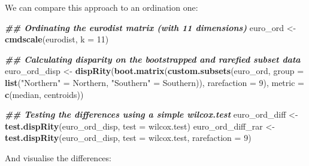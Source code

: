 \documentclass[
]{book}
\newenvironment{Shaded}{\begin{snugshade}}{\end{snugshade}}
\newcommand{\AttributeTok}[1]{\textcolor[rgb]{0.13,0.29,0.53}{#1}}
\newcommand{\DecValTok}[1]{\textcolor[rgb]{0.00,0.00,0.81}{#1}}
\newcommand{\DocumentationTok}[1]{\textcolor[rgb]{0.56,0.35,0.01}{\textbf{\textit{#1}}}}
\newcommand{\FunctionTok}[1]{\textcolor[rgb]{0.13,0.29,0.53}{\textbf{#1}}}
\newcommand{\NormalTok}[1]{#1}
\newcommand{\OtherTok}[1]{\textcolor[rgb]{0.56,0.35,0.01}{#1}}
\newcommand{\StringTok}[1]{\textcolor[rgb]{0.31,0.60,0.02}{#1}}
\begin{document}
We can compare this approach to an ordination one:

\begin{Shaded}
\begin{Highlighting}[]
\DocumentationTok{\#\# Ordinating the eurodist matrix (with 11 dimensions)}
\NormalTok{euro\_ord }\OtherTok{\textless{}{-}} \FunctionTok{cmdscale}\NormalTok{(eurodist, }\AttributeTok{k =} \DecValTok{11}\NormalTok{)}

\DocumentationTok{\#\# Calculating disparity on the bootstrapped and rarefied subset data}
\NormalTok{euro\_ord\_disp }\OtherTok{\textless{}{-}} \FunctionTok{dispRity}\NormalTok{(}\FunctionTok{boot.matrix}\NormalTok{(}\FunctionTok{custom.subsets}\NormalTok{(euro\_ord, }\AttributeTok{group =}
        \FunctionTok{list}\NormalTok{(}\StringTok{"Northern"} \OtherTok{=}\NormalTok{ Northern, }\StringTok{"Southern"} \OtherTok{=}\NormalTok{ Southern)), }\AttributeTok{rarefaction =} \DecValTok{9}\NormalTok{),}
        \AttributeTok{metric =} \FunctionTok{c}\NormalTok{(median, centroids))}

\DocumentationTok{\#\# Testing the differences using a simple wilcox.test}
\NormalTok{euro\_ord\_diff }\OtherTok{\textless{}{-}} \FunctionTok{test.dispRity}\NormalTok{(euro\_ord\_disp, }\AttributeTok{test =}\NormalTok{ wilcox.test)}
\NormalTok{euro\_ord\_diff\_rar }\OtherTok{\textless{}{-}} \FunctionTok{test.dispRity}\NormalTok{(euro\_ord\_disp, }\AttributeTok{test =}\NormalTok{ wilcox.test, }\AttributeTok{rarefaction =} \DecValTok{9}\NormalTok{)}
\end{Highlighting}
\end{Shaded}

And visualise the differences:
\end{document}
